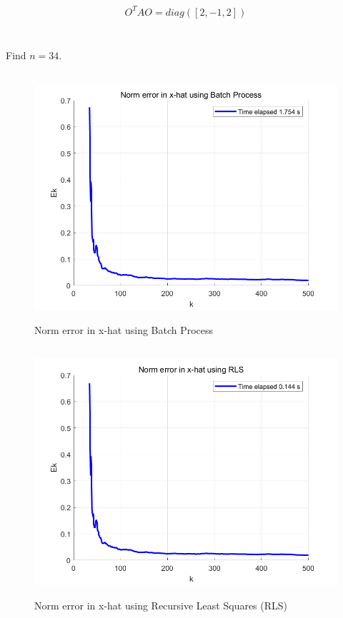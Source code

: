 \documentclass{article}
\theoremstyle{definition} %
\begin{document}
\section{}
\begin{align*}
	O^T A O = diag([2, -1, 2])
\end{align*}

\section{}

\subsection{}
Find $n=34$.

\subsection{}
\begin{figure}[H]
    \centering
        \textsf{\includegraphics[width=0.6\columnwidth]{HW7-prob4-fig1.png}}
        \caption{Norm error in x-hat using Batch Process}
        \label{fig: 4-1}
\end{figure}

\subsection{}
\begin{figure}[H]
    \centering
        \textsf{\includegraphics[width=0.6\columnwidth]{HW7-prob4-fig2.png}}
        \caption{Norm error in x-hat using Recursive Least Squares (RLS)}
        \label{fig: 4-2}
\end{figure}
\end{document}
